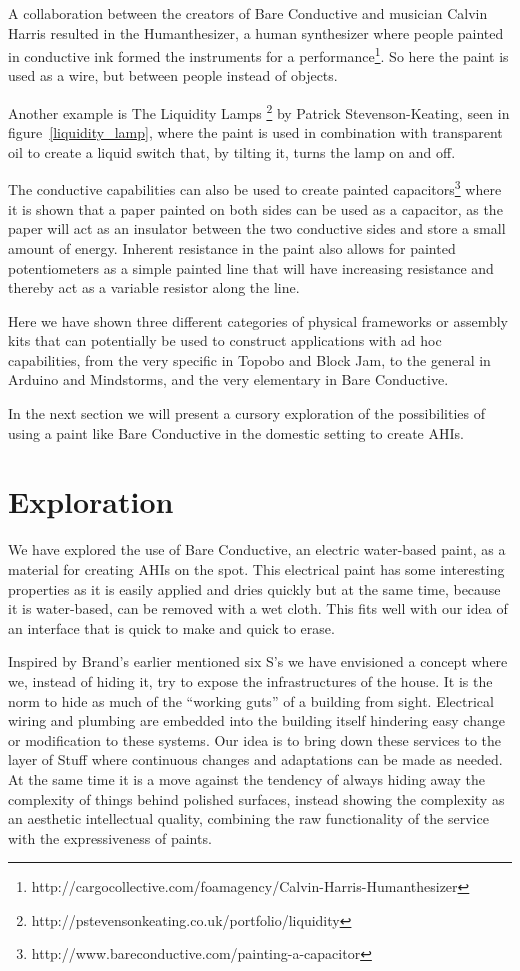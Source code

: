 A collaboration between the creators of Bare Conductive and musician Calvin Harris resulted in the Humanthesizer, a human synthesizer where people painted in conductive ink formed the instruments for a performance\footnote{http://cargocollective.com/foamagency/Calvin-Harris-Humanthesizer}.
So here the paint is used as a wire, but between people instead of objects.

Another example is The Liquidity Lamps \footnote{http://pstevensonkeating.co.uk/portfolio/liquidity} by Patrick Stevenson-Keating, seen in figure~\ref{liquidity_lamp}, where the paint is used in combination with transparent oil to create a liquid switch that, by tilting it, turns the lamp on and off.

The conductive capabilities can also be used to create painted capacitors\footnote{http://www.bareconductive.com/painting-a-capacitor} where it is shown that a paper painted on both sides can be used as a capacitor, as the paper will act as an insulator between the two conductive sides and store a small amount of energy.
Inherent resistance in the paint also allows for painted potentiometers as a simple painted line that will have increasing resistance and thereby act as a variable resistor along the line.

Here we have shown three different categories of physical frameworks or assembly kits that can potentially be used to construct applications with ad hoc capabilities, from the very specific in Topobo and Block Jam, to the general in Arduino and Mindstorms, and the very elementary in Bare Conductive.

In the next section we will present a cursory exploration of the possibilities of using a paint like Bare Conductive in the domestic setting to create AHIs.

\section{Exploration}
We have explored the use of Bare Conductive, an electric water-based paint, as a material for creating AHIs on the spot.
This electrical paint has some interesting properties as it is easily applied and dries quickly but at the same time, because it is water-based, can be removed with a wet cloth.
This fits well with our idea of an interface that is quick to make and quick to erase.

Inspired by Brand's earlier mentioned six S's \citep{brand1995buildings} we have envisioned a concept where we, instead of hiding it, try to expose the infrastructures of the house.
It is the norm to hide as much of the ``working guts'' of a building from sight.
Electrical wiring and plumbing are embedded into the building itself hindering easy change or modification to these systems.
Our idea is to bring down these services to the layer of Stuff where continuous changes and adaptations can be made as needed.
At the same time it is a move against the tendency of always hiding away the complexity of things behind polished surfaces, instead showing the complexity as an aesthetic intellectual quality, combining the raw functionality of the service with the expressiveness of paints.

